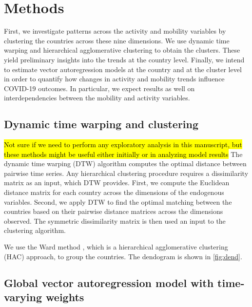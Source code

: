 \documentclass[preprint, 12pt]{elsarticle}
\newcommand{\?}{\stackrel{?}{=}}
\begin{document}
 


\section{Methods}
First, we investigate patterns across the activity and mobility variables by clustering the countries across these nine dimensions.
We use dynamic time warping and hierarchical agglomerative clustering to obtain the clusters.
These yield preliminary insights into the trends at the country level.
Finally, we intend to estimate vector autoregression models at the country and at the cluster level in order to quantify how changes in activity and mobility trends influence COVID-19 outcomes. 
In particular, we expect results as well on interdependencies between the mobility and activity variables.


\subsection{Dynamic time warping and clustering}
\hl{Not sure if we need to perform any exploratory analysis in this manuscript, but these methods might be useful either initially or in analyzing model results}
The dynamic time warping (DTW) algorithm \cite{giorgino2009computing} computes the optimal distance between pairwise time series.
Any hierarchical clustering procedure requires a dissimilarity matrix as an input, which DTW provides.
First, we compute the Euclidean distance matrix for each country across the dimensions of the endogenous variables.
Second, we apply DTW to find the optimal matching between the countries based on their pairwise distance matrices across the dimensions observed.
The symmetric dissimilarity matrix is then used an input to the clustering algorithm.

We use the Ward method \cite{murtagh2014ward}, which is a hierarchical agglomerative clustering (HAC) approach, to group the countries.
The dendogram is shown in \autoref{fig:dend}.


\subsection{Global vector autoregression model with time-varying weights}

\end{document}
